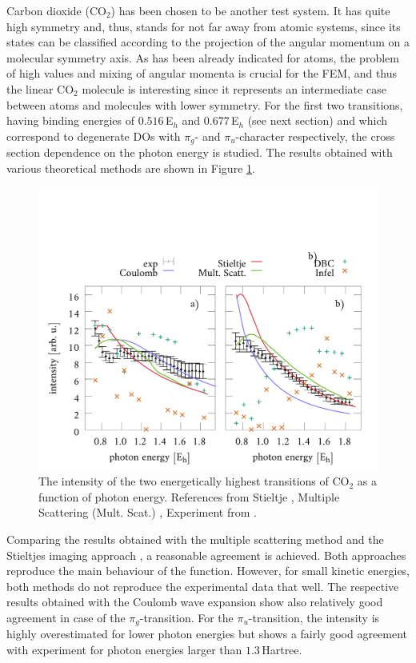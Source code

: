 Carbon dioxide (CO$_2$) has been chosen to be another test system.
It has quite high symmetry and, thus, stands for not far away from atomic systems, since its states can be classified according to the projection of the angular momentum on a molecular symmetry axis.
As has been already indicated for atoms, the problem of high values and mixing of angular momenta is crucial for the FEM, and thus the linear CO$_2$ molecule is interesting since it represents an intermediate case between atoms and molecules with lower symmetry.
For the first two transitions, having binding energies of $0.516\,$E$_h$ and $0.677\,$E$_h$ (see next section) and which correspond to degenerate DOs with $\pi_g$- and $\pi_u$-character respectively, the cross section dependence on the photon energy is studied.
The results obtained with various theoretical methods are shown in Figure \ref{fig:CO2CS}.
\begin{figure}
\includegraphics[width=\textwidth]{Figures/CO2/CrossSect}
\caption{The intensity of the two energetically highest transitions of CO$_2$ as a function of photon energy.
References from Stieltje \cite{stieltje}, Multiple Scattering (Mult. Scat.) \cite{Liscatt}, Experiment from \cite{LiExp}.}
\label{fig:CO2CS}
\end{figure}
Comparing the results obtained with the multiple scattering method \cite{Liscatt} and the Stieltjes imaging approach \cite{stieltje}, a reasonable agreement is achieved.
Both approaches reproduce the main behaviour of the function.
However, for small kinetic energies, both methods do not reproduce the experimental data that well.
The respective results obtained with the Coulomb wave expansion show also relatively good agreement in case of the $\pi_g$-transition.
For the $\pi_u$-transition, the intensity is highly overestimated for lower photon energies but shows a fairly good agreement with experiment for photon energies larger than $1.3\,$Hartree.

